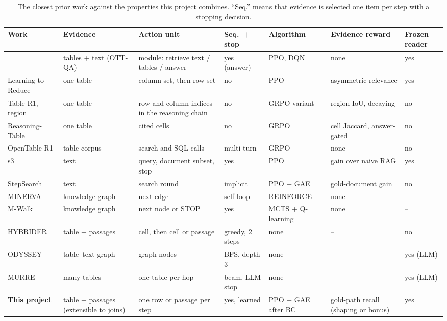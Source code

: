 \begin{table}[p]
\centering
\footnotesize
\caption{The closest prior work against the properties this project combines. ``Seq.'' means that evidence is selected one item per step with a stopping decision.}
\label{tab:landscape}
\setlength{\tabcolsep}{3.5pt}
\begin{tabularx}{\textwidth}{@{}>{\raggedright\arraybackslash}p{2.5cm}>{\raggedright\arraybackslash}X>{\raggedright\arraybackslash}X>{\raggedright\arraybackslash}p{1.6cm}>{\raggedright\arraybackslash}p{2.05cm}>{\raggedright\arraybackslash}p{1.8cm}>{\raggedright\arraybackslash}p{1.1cm}@{}}
\toprule
Work & Evidence & Action unit & Seq.\ + stop & Algorithm & Evidence reward & Frozen reader \\
\midrule
\citet{jose2024qatexttablesdrl} & tables + text (OTT-QA) & module: retrieve text / tables / answer & yes (answer) & PPO, DQN & none & yes \\
Learning to Reduce \citep{lee2024learningtoreduce} & one table & column set, then row set & no & PPO & asymmetric relevance & yes \\
Table-R1, region \citep{wu2025tabler1region} & one table & row and column indices in the reasoning chain & no & GRPO variant & region IoU, decaying & no \\
Reasoning-Table \citep{lei2025reasoningtable} & one table & cited cells & no & GRPO & cell Jaccard, answer-gated & no \\
OpenTable-R1 \citep{qiu2025opentabler1} & table corpus & search and SQL calls & multi-turn & GRPO & none & no \\
s3 \citep{jiang2025s3} & text & query, document subset, stop & yes & PPO & gain over naive RAG & yes \\
StepSearch \citep{wang2025stepsearch} & text & search round & implicit & PPO + GAE & gold-document gain & no \\
MINERVA \citep{das2018minerva} & knowledge graph & next edge & self-loop & REINFORCE & none & -- \\
M-Walk \citep{shen2018mwalk} & knowledge graph & next node or STOP & yes & MCTS + Q-learning & none & -- \\
HYBRIDER \citep{chen-etal-2020-hybridqa} & table + passages & cell, then cell or passage & greedy, 2 steps & none & -- & no \\
ODYSSEY \citep{agarwal-etal-2025-hybrid} & table--text graph & graph nodes & BFS, depth 3 & none & -- & yes (LLM) \\
MURRE \citep{zhang2025murre} & many tables & one table per hop & beam, LLM stop & none & -- & yes (LLM) \\
\midrule
\textbf{This project} & table + passages (extensible to joins) & one row or passage per step & yes, learned & PPO + GAE after BC & gold-path recall (shaping or bonus) & yes \\
\bottomrule
\end{tabularx}
\end{table}
